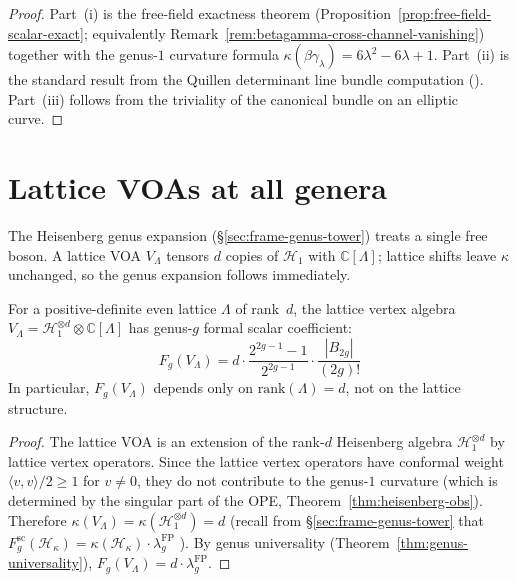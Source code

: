 \begin{proof}
Part~(i) is the free-field exactness theorem
(Proposition~\ref{prop:free-field-scalar-exact}; equivalently
Remark~\ref{rem:betagamma-cross-channel-vanishing}) together with
the genus-$1$ curvature formula
$\kappa(\beta\gamma_\lambda)=6\lambda^2-6\lambda+1$.
Part~(ii) is the standard result from the
Quillen determinant line bundle computation \cite{Quillen85}
(\ClaimStatusProvedElsewhere).
Part~(iii) follows from the triviality of the
canonical bundle on an elliptic curve.
\end{proof}

\section{Lattice VOAs at all genera}\label{sec:lattice-genera}

The Heisenberg genus expansion (\S\ref{sec:frame-genus-tower}) treats a single free boson. A lattice VOA $V_\Lambda$ tensors $d$ copies of $\mathcal{H}_1$ with $\mathbb{C}[\Lambda]$; lattice shifts leave $\kappa$ unchanged, so the genus expansion follows immediately.

\begin{theorem}
For a positive-definite even lattice $\Lambda$ of
rank~$d$, the lattice vertex algebra
$V_\Lambda = \mathcal{H}_1^{\otimes d} \otimes
\mathbb{C}[\Lambda]$
has genus-$g$ formal scalar coefficient:
\begin{equation}F_g(V_\Lambda) = d \cdot
\frac{2^{2g-1}-1}{2^{2g-1}} \cdot
\frac{|B_{2g}|}{(2g)!}
\end{equation}
In particular, $F_g(V_\Lambda)$ depends only on
$\mathrm{rank}(\Lambda) = d$, not on the lattice
structure.
\end{theorem}

\begin{proof}
The lattice VOA is an extension of the rank-$d$
Heisenberg algebra $\mathcal{H}_1^{\otimes d}$ by
lattice vertex operators. Since the lattice vertex
operators have conformal weight $\langle v, v
\rangle / 2 \geq 1$ for $v \neq 0$, they do not
contribute to the genus-$1$ curvature (which is
determined by the singular part of the OPE,
Theorem~\ref{thm:heisenberg-obs}).
Therefore $\kappa(V_\Lambda) =
\kappa(\mathcal{H}_1^{\otimes d}) = d$
(recall from \S\ref{sec:frame-genus-tower} that
$F_g^{\mathrm{sc}}(\mathcal{H}_\kappa) =
\kappa(\mathcal{H}_\kappa) \cdot \lambda_g^{\mathrm{FP}}$ ).
By genus universality
(Theorem~\ref{thm:genus-universality}),
$F_g(V_\Lambda) = d \cdot \lambda_g^{\mathrm{FP}}$.
\end{proof}

